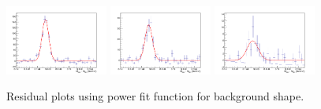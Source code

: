 \begin{figure}[!h]
\begin{center}
\includegraphics[width=0.3\textwidth]{figures/Dstar/pp13TeV/multi_trial/residual_plot_Pow_bkg_func_16-24GeV.png} 
\includegraphics[width=0.3\textwidth]{figures/Dstar/pp13TeV/multi_trial/residual_plot_Pow_bkg_func_24-36GeV.png}
\includegraphics[width=0.3\textwidth]{figures/Dstar/pp13TeV/multi_trial/residual_plot_Pow_bkg_func_36-50GeV.png} 

\caption{Residual plots using power fit function for background shape.}
\label{fig:DstarYield_residual_power}
\end{center}
\end{figure}







